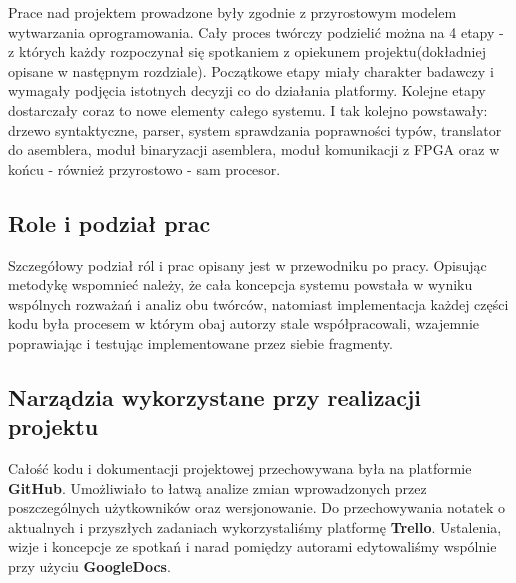 Prace nad projektem prowadzone były zgodnie z przyrostowym modelem wytwarzania oprogramowania. Cały proces twórczy podzielić można na 4 etapy - z których każdy rozpoczynał się spotkaniem z opiekunem projektu(dokładniej opisane w następnym rozdziale). Początkowe etapy miały charakter badawczy i wymagały podjęcia istotnych decyzji co do działania platformy. Kolejne etapy dostarczały coraz to nowe elementy całego systemu. I tak kolejno powstawały: drzewo syntaktyczne, parser, system sprawdzania poprawności typów, translator do asemblera, moduł binaryzacji asemblera, moduł komunikacji z FPGA oraz w końcu - również przyrostowo - sam procesor.

\subsection{Role i podział prac}
Szczegółowy podział ról i prac opisany jest w przewodniku po pracy. Opisując metodykę wspomnieć należy, że cała koncepcja systemu powstała w wyniku wspólnych rozważań i analiz obu twórców, natomiast implementacja każdej części kodu była procesem w którym obaj autorzy stale współpracowali, wzajemnie poprawiając i testując implementowane przez siebie fragmenty.

\subsection{Narządzia wykorzystane przy realizacji projektu}
Całość kodu i dokumentacji projektowej przechowywana była na platformie \textbf{GitHub}. Umożliwiało to łatwą analize zmian wprowadzonych przez poszczególnych użytkowników oraz wersjonowanie. Do przechowywania notatek o aktualnych i przyszłych zadaniach wykorzystaliśmy platformę \textbf{Trello}. Ustalenia, wizje i koncepcje ze spotkań i narad pomiędzy autorami edytowaliśmy wspólnie przy użyciu \textbf{GoogleDocs}.